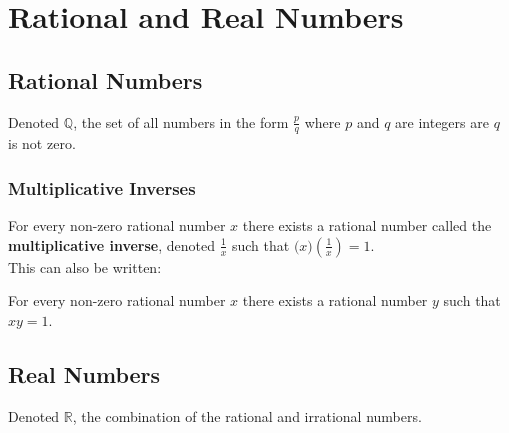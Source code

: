 \documentclass[../notes.tex]{subfiles}
\begin{document}
	\ifSubfilesClassLoaded{\setcounter{chapter}{1}}{}
	\chapter{Rational and Real Numbers}
		\section{Rational Numbers}
			Denoted $\mathbb{Q}$, the set of all numbers in the form $\frac{p}{q}$ where $p$ and $q$ are integers are $q$ is not zero.
			\subsection{Multiplicative Inverses}
				For every non-zero rational number $x$ there exists a rational number called the \textbf{multiplicative inverse}, denoted $\frac{1}{x}$ such that $\bigl(x\bigr)\left(\frac{1}{x}\right) = 1$.\\
				This can also be written:
				\begin{indentparagraph}
					For every non-zero rational number $x$ there exists a rational number $y$ such that $xy = 1$.
				\end{indentparagraph}
		\section{Real Numbers}
			Denoted $\mathbb{R}$, the combination of the rational and irrational numbers.
\end{document}
